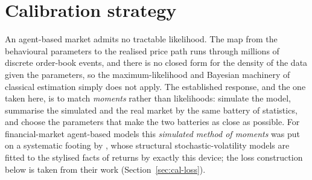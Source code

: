 %
%
%



\section{Calibration strategy}
\label{sec:cal-strategy}

An agent-based market admits no tractable likelihood. The map from the
behavioural parameters to the realised price path runs through millions of
discrete order-book events, and there is no closed form for the density of the
data given the parameters, so the maximum-likelihood and Bayesian machinery of
classical estimation simply does not apply. The established response, and the
one taken here, is to match \emph{moments} rather than likelihoods: simulate the
model, summarise the simulated and the real market by the same battery of
statistics, and choose the parameters that make the two batteries as close as
possible. For financial-market agent-based models this \emph{simulated method of
moments} was put on a systematic footing by \citet{franke_westerhoff_2012},
whose structural stochastic-volatility models are fitted to the stylised facts
of returns by exactly this device; the loss construction below is taken from
their work (Section~\ref{sec:cal-loss}).

